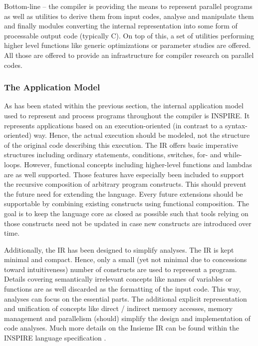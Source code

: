 Bottom-line -- the compiler is providing the means to represent parallel
programs as well as utilities to derive them from input codes, analyse and
manipulate them and finally modules converting the internal representation into
some form of processable output code (typically C). On top of this, a set of
utilities performing higher level functions like generic optimizations or
parameter studies are offered. All those are offered to provide an
infrastructure for compiler research on parallel codes.

\subsubsection{The Application Model}
As has been stated within the previous section, the internal application model
used to represent and process programs throughout the compiler is INSPIRE. It
represents applications based on an execution-oriented (in contrast to a
syntax-oriented) way. Hence, the actual execution should be modeled, not the
structure of the original code describing this execution. The IR offers basic
imperative structures including ordinary statements, conditions, switches,
for- and while-loops. However, functional concepts including higher-level
functions and lambdas are as well supported. Those features have especially been
included to support the recursive composition of arbitrary program constructs.
This should prevent the future need for extending the language. Every future
extensions should be supportable by combining existing constructs using
functional composition. The goal is to keep the language core as closed as
possible such that tools relying on those constructs need not be updated in case
new constructs are introduced over time.

Additionally, the IR has been designed to simplify analyses. The IR is kept
minimal and compact. Hence, only a small (yet not minimal due to concessions
toward intuitiveness) number of constructs are used to represent a program.
Details covering semantically irrelevant concepts like names of variables or
functions are as well discarded as the formatting of the input code. This way,
analyses can focus on the essential parts. The additional explicit
representation and unification of concepts like direct / indirect memory
accesses, memory management and parallelism (should) simplify the design and
implementation of code analyses.  Much more details on the Insieme IR can be
found within the INSPIRE language specification \cite{insieme_ir_spec}.


